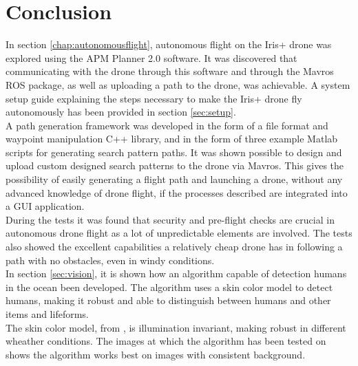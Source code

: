 \chapter{Conclusion}

In section \ref{chap:autonomousflight}, autonomous flight on the Iris+ drone was explored using the APM Planner 2.0 software.
It was discovered that communicating with the drone through this software and through the Mavros ROS package,
as well as uploading a path to the drone, was achievable.
A system setup guide explaining the steps necessary to make the Iris+ drone fly autonomously has been provided in section \ref{sec:setup}.
\\
A path generation framework was developed in the form of a file format and waypoint manipulation C++ library,
and in the form of three example Matlab scripts for generating search pattern paths.
It was shown possible to design and upload custom designed search patterns to the drone via Mavros.
This gives the possibility of easily generating a flight path and launching a drone, without any advanced knowledge of drone flight,
if the processes described are integrated into a GUI application.\\

During the tests it was found that security and pre-flight checks are crucial in autonomous drone flight
as a lot of unpredictable elements are involved.
The tests also showed the excellent capabilities a relatively cheap drone has in following a path with no obstacles, even in windy conditions.\\

In section \ref{sec:vision}, it is shown how an algorithm capable of detection humans in the ocean been developed. 
The algorithm uses a skin color model to detect humans, making it robust and able to distinguish between humans and other items and lifeforms.\\
 
The skin color model, from \cite{Ref:SkinDetection}, is illumination invariant, making robust in different wheather conditions. 
The images at which the algorithm has been tested on  shows the algorithm works best on images with consistent background. 
\newpage